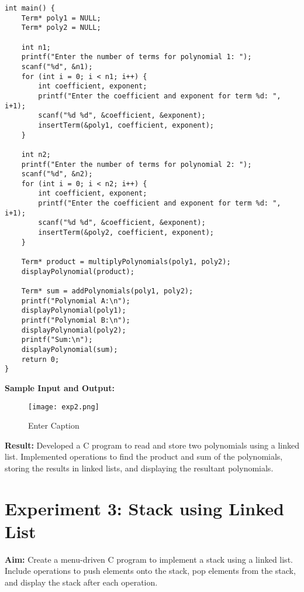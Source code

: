 \documentclass{article}
\begin{document}
\begin{lstlisting}
int main() {
    Term* poly1 = NULL;
    Term* poly2 = NULL;

    int n1;
    printf("Enter the number of terms for polynomial 1: ");
    scanf("%d", &n1);
    for (int i = 0; i < n1; i++) {
        int coefficient, exponent;
        printf("Enter the coefficient and exponent for term %d: ", i+1);
        scanf("%d %d", &coefficient, &exponent);
        insertTerm(&poly1, coefficient, exponent);
    }

    int n2;
    printf("Enter the number of terms for polynomial 2: ");
    scanf("%d", &n2);
    for (int i = 0; i < n2; i++) {
        int coefficient, exponent;
        printf("Enter the coefficient and exponent for term %d: ", i+1);
        scanf("%d %d", &coefficient, &exponent);
        insertTerm(&poly2, coefficient, exponent);
    }

    Term* product = multiplyPolynomials(poly1, poly2);
    displayPolynomial(product);

    Term* sum = addPolynomials(poly1, poly2);
    printf("Polynomial A:\n");
    displayPolynomial(poly1);
    printf("Polynomial B:\n");
    displayPolynomial(poly2);
    printf("Sum:\n");
    displayPolynomial(sum);
    return 0;
}

\end{lstlisting}

\textbf{Sample Input and Output:}
\begin{figure}[h]
    \centering
    \texttt{[image: exp2.png]}
    \caption{Enter Caption}
    \label{fig:enter-label}
\end{figure}

\textbf{Result:} Developed a C program to read and store two polynomials using a linked list. Implemented operations to find the product and sum of the polynomials, storing the results in linked lists, and displaying the resultant polynomials.

\clearpage
{}
\section{Experiment 3: Stack using Linked List}
\textbf{Aim:} Create a menu-driven C program to implement a stack using a linked list. Include operations to push elements onto the stack, pop elements from the stack, and display the stack after each operation.
\end{document}

